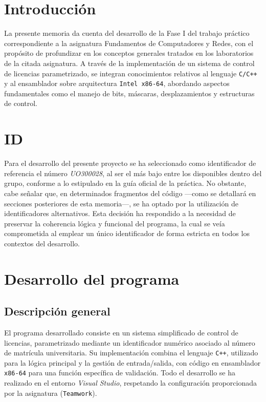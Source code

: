 \documentclass[11pt,a4paper]{article}
\begin{document}
\newpage
\hypersetup{linkcolor=black}
\tableofcontents
\hypersetup{linkcolor=blue}
\newpage

\section{Introducción}
La presente memoria da cuenta del desarrollo de la Fase I del trabajo práctico correspondiente a la asignatura Fundamentos de Computadores y Redes, con el propósito de profundizar en los conceptos generales tratados en los laboratorios de la citada asignatura. A través de la implementación de un sistema de control de licencias parametrizado, se integran conocimientos relativos al lenguaje \texttt{C/C++} y al ensamblador sobre arquitectura \texttt{Intel x86-64}, abordando aspectos fundamentales como el manejo de bits, máscaras, desplazamientos y estructuras de control.\vspace{3ex}



\section{ID}
Para el desarrollo del presente proyecto se ha seleccionado como identificador de referencia el número \textit{UO300028}, al ser el más bajo entre los disponibles dentro del grupo, conforme a lo estipulado en la guía oficial de la práctica. No obstante, cabe señalar que, en determinados fragmentos del código —como se detallará en secciones posteriores de esta memoria—, se ha optado por la utilización de identificadores alternativos. Esta decisión ha respondido a la necesidad de preservar la coherencia lógica y funcional del programa, la cual se veía comprometida al emplear un único identificador de forma estricta en todos los contextos del desarrollo.
\vspace{3ex}

\section{Desarrollo del programa}
\subsection{Descripción general}
El programa desarrollado consiste en un sistema simplificado de control de licencias, parametrizado mediante un identificador numérico asociado al número de matrícula universitaria. Su implementación combina el lenguaje \texttt{C++}, utilizado para la lógica principal y la gestión de entrada/salida, con código en ensamblador \texttt{x86-64} para una función específica de validación. Todo el desarrollo se ha realizado en el entorno \textit{Visual Studio}, respetando la configuración proporcionada por la asignatura (\texttt{Teamwork}).
\end{document}
